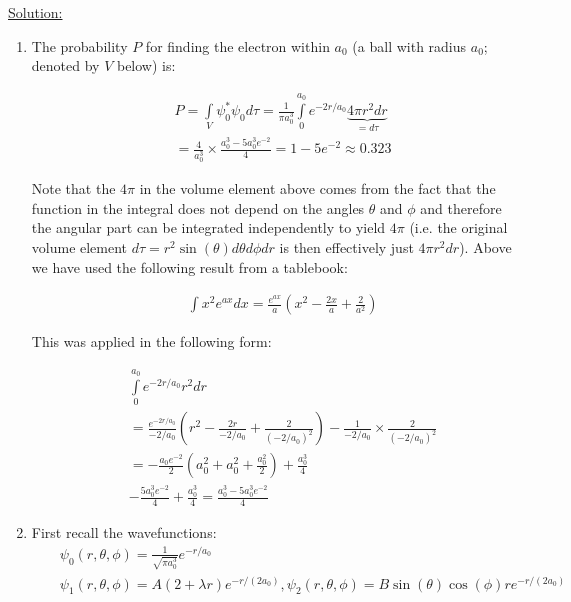 \noindent
\underline{Solution:}\\

\begin{enumerate}
\item The probability $P$ for finding the electron within $a_0$ (a ball with radius $a_0$; denoted by $V$ below) is:

\begin{eqnarray}
\nonumber
& & P = \int\limits_V\psi_0^*\psi_0d\tau = \frac{1}{\pi a_0^3} \int\limits_{0}^{a_0} e^{-2r/a_0}\underbrace{4\pi r^2dr}_{= d\tau}\\
\nonumber
& & = \frac{4}{a_0^3}\times\frac{a_0^3 - 5a_0^3e^{-2}}{4} = 1 - 5e^{-2}\approx 0.323
\end{eqnarray}

Note that the $4\pi$ in the volume element above comes from the fact that the function in the integral does not depend on the angles $\theta$ and $\phi$ and therefore the angular part can be integrated independently to yield $4\pi$ (i.e. the original volume element $d\tau = r^2\sin(\theta)d\theta d\phi dr$ is then effectively just $4\pi r^2dr$). Above we have used the following result from a tablebook:

\begin{eqnarray}
& & \int x^2e^{ax}dx = \frac{e^{ax}}{a}\left(x^2 - \frac{2x}{a} + \frac{2}{a^2}\right)
\nonumber
\end{eqnarray}

This was applied in the following form:

\begin{eqnarray}
\nonumber
& & \int\limits_{0}^{a_0} e^{-2r/a_0}r^2dr\\
\nonumber
& & =\frac{e^{-2r/a_0}}{-2/a_0}\left(r^2 - \frac{2r}{-2/a_0} + \frac{2}{(-2/a_0)^2}\right) - \frac{1}{-2/a_0}\times \frac{2}{(-2/a_0)^2}\\
\nonumber
& & = -\frac{a_0 e^{-2}}{2}\left(a_0^2 + a_0^2 + \frac{a_0^2}{2}\right) + \frac{a_0^3}{4}\\
\nonumber
& & -\frac{5a_0^3e^{-2}}{4} + \frac{a_0^3}{4} = \frac{a_0^3 - 5a_0^3e^{-2}}{4}
\end{eqnarray}

\item First recall the wavefunctions:
\begin{eqnarray}
\nonumber
& & \psi_0(r,\theta,\phi) = \frac{1}{\sqrt{\pi a_0^3}}e^{-r/a_0}\\
\nonumber
& & \psi_1(r,\theta,\phi) = A(2 + \lambda r)e^{-r/(2a_0)}, \psi_2(r,\theta,\phi) = B\sin(\theta)\cos(\phi)re^{-r/(2a_0)}
\end{eqnarray}


\end{enumerate}
